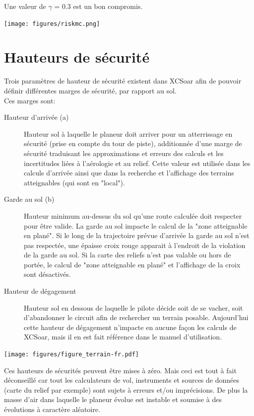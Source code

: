 Une valeur de  $\gamma$  = 0.3 est un bon compromis.

\begin{center}
\texttt{[image: figures/riskmc.png]}
\end{center}

\section{Hauteurs de sécurité}\label{sec:safety-heights}
Trois paramètres de hauteur de sécurité existent dans XCSoar afin de pouvoir définir différentes marges de sécurité, par rapport au sol.
\\
Ces marges sont:
\begin{description}
\item[Hauteur d'arrivée (a)]  Hauteur sol à laquelle le planeur doit arriver pour un atterrissage en sécurité (prise en compte du tour de piste), additionnée d'une marge de sécurité traduisant les  approximations et erreurs des calculs et les incertitudes liées à l'aérologie et au relief. Cette valeur est utilisée dans les calculs d'arrivée ainsi que dans la recherche et l'affichage des terrains atteignables (qui sont en "local").
\item[Garde au sol (b)] Hauteur minimum au-dessus du sol qu'une route calculée doit respecter pour être valide. La garde au sol impacte le calcul de la "zone atteignable en plané". Si le long de la trajectoire prévue d'arrivée la garde au sol n'est pas respectée, une épaisse croix rouge apparait à l'endroit de la violation de la garde au sol. Si la carte des reliefs n'est pas valable ou hors de portée, le calcul de "zone atteignable en plané" et l'affichage de la croix sont désactivés.
\item[Hauteur de dégagement]  Hauteur sol en dessous de laquelle le pilote décide soit de se vacher, soit d'abandonner le circuit afin de rechercher un terrain posable. Aujourd'hui cette hauteur de dégagement n'impacte en aucune façon les calculs de XCSoar, mais il en est fait référence dans le manuel d'utilisation.
\end{description}

\begin{center}
\texttt{[image: figures/figure\_terrain-fr.pdf]}
\end{center}

\warning
Ces hauteurs de sécurités peuvent être mises à zéro. Mais ceci est tout à fait déconseillé car tout les calculateurs de vol, instruments et sources de données (carte du relief par exemple) sont sujets à erreurs et/ou imprécisions. De plus la masse d'air dans laquelle le planeur évolue est instable et soumise à des évolutions à caractère aléatoire.

